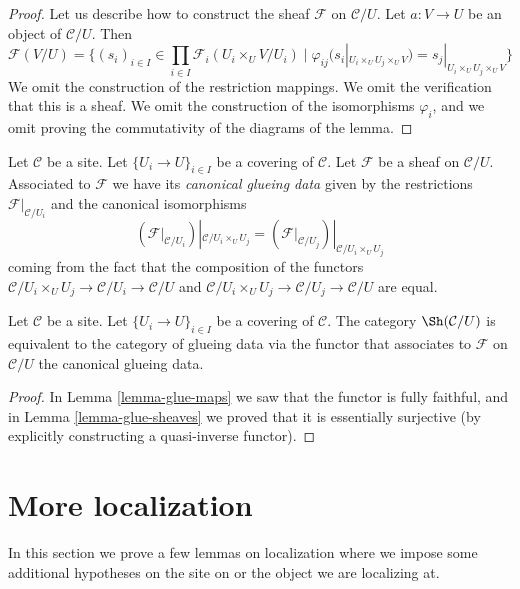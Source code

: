 \begin{proof}
Let us describe how to construct the sheaf $\mathcal{F}$ on
$\mathcal{C}/U$. Let $a : V \to U$ be an object of $\mathcal{C}/U$.
Then
$$
\mathcal{F}(V/U) = \{
(s_i)_{i \in I} \in \prod_{i \in I} \mathcal{F}_i(U_i \times_U V/U_i)
\mid
\varphi_{ij}(s_i|_{U_i \times_U U_j \times_U V})
=
s_j|_{U_i \times_U U_j \times_U V}
\}
$$
We omit the construction of the restriction mappings.
We omit the verification that this is a sheaf.
We omit the construction of the isomorphisms $\varphi_i$,
and we omit proving the commutativity of the diagrams
of the lemma.
\end{proof}

\noindent
Let $\mathcal{C}$ be a site.
Let $\{U_i \to U\}_{i \in I}$ be a covering of $\mathcal{C}$.
Let $\mathcal{F}$ be a sheaf on $\mathcal{C}/U$.
Associated to $\mathcal{F}$ we have its
{\it canonical glueing data} given by the restrictions
$\mathcal{F}|_{\mathcal{C}/U_i}$ and the canonical isomorphisms
$$
\left(\mathcal{F}|_{\mathcal{C}/U_i}\right)|_{\mathcal{C}/U_i \times_U U_j}
=
\left(\mathcal{F}|_{\mathcal{C}/U_j}\right)|_{\mathcal{C}/U_i \times_U U_j}
$$
coming from the fact that the composition of the functors
$\mathcal{C}/U_i \times_U U_j \to \mathcal{C}/U_i \to \mathcal{C}/U$
and
$\mathcal{C}/U_i \times_U U_j \to \mathcal{C}/U_j \to \mathcal{C}/U$
are equal.

\begin{lemma}
\label{lemma-mapping-property-glue}
Let $\mathcal{C}$ be a site.
Let $\{U_i \to U\}_{i \in I}$ be a covering of $\mathcal{C}$.
The category $\Sh(\mathcal{C}/U)$ is equivalent
to the category of glueing data via the functor that associates
to $\mathcal{F}$ on $\mathcal{C}/U$ the canonical glueing data.
\end{lemma}

\begin{proof}
In
Lemma \ref{lemma-glue-maps}
we saw that the functor is fully faithful, and in
Lemma \ref{lemma-glue-sheaves}
we proved that it is essentially surjective (by explicitly constructing
a quasi-inverse functor).
\end{proof}




\section{More localization}
\label{section-more-localize}

\noindent
In this section we prove a few lemmas on localization where we
impose some additional hypotheses on the site on or the object
we are localizing at.

